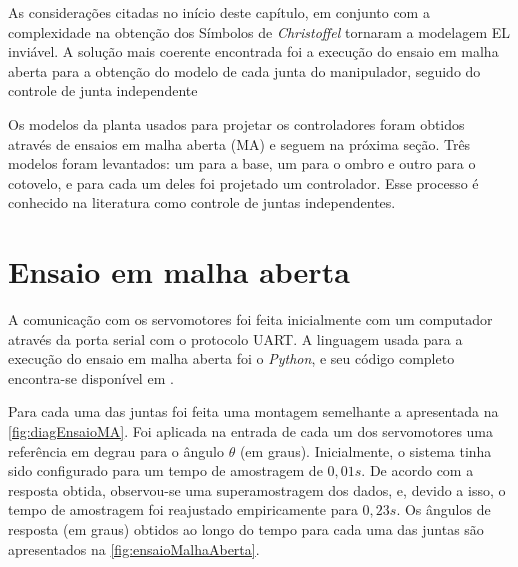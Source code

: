 As considerações citadas no início deste capítulo, em conjunto com a complexidade na obtenção dos Símbolos de \textit{Christoffel}
tornaram a modelagem EL inviável. A solução mais coerente encontrada foi a execução do ensaio em malha aberta para a obtenção do modelo 
de cada junta do manipulador, seguido do controle de junta independente

Os modelos da planta usados para projetar os controladores foram obtidos através de ensaios em malha aberta (MA) e seguem 
na próxima seção. Três modelos foram levantados: um para a base, um para o ombro e outro para o cotovelo, e para 
cada um deles foi projetado um controlador. Esse processo é conhecido na literatura como controle de juntas independentes.

\section{Ensaio em malha aberta}

A comunicação com os servomotores foi feita inicialmente com um computador através da porta serial com o protocolo 
UART. A linguagem usada para a execução do ensaio em malha aberta foi o \textit{Python}, e seu código completo
encontra-se disponível em \cite{lelis_model}.

Para cada uma das juntas foi feita uma montagem semelhante a apresentada na \autoref{fig:diagEnsaioMA}. Foi aplicada na entrada de
cada um dos servomotores uma referência em degrau para o ângulo $\theta$ (em graus). Inicialmente, o sistema tinha sido
configurado para um tempo de amostragem de $0,01s$. De acordo com a resposta obtida, observou-se uma superamostragem dos dados,
e, devido a isso, o tempo de amostragem foi reajustado empiricamente para $0,23s$. Os ângulos de resposta (em graus) obtidos
ao longo do tempo para cada uma das juntas são apresentados na \autoref{fig:ensaioMalhaAberta}.

